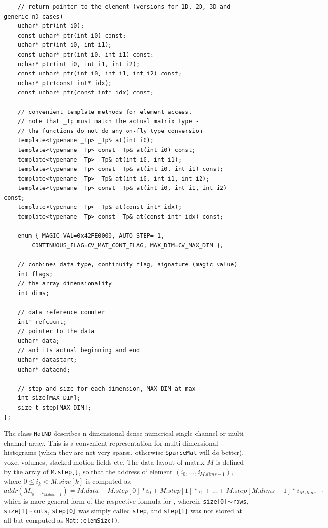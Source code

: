 \begin{lstlisting}
    // return pointer to the element (versions for 1D, 2D, 3D and generic nD cases)
    uchar* ptr(int i0);
    const uchar* ptr(int i0) const;
    uchar* ptr(int i0, int i1);
    const uchar* ptr(int i0, int i1) const;
    uchar* ptr(int i0, int i1, int i2);
    const uchar* ptr(int i0, int i1, int i2) const;
    uchar* ptr(const int* idx);
    const uchar* ptr(const int* idx) const;

    // convenient template methods for element access.
    // note that _Tp must match the actual matrix type -
    // the functions do not do any on-fly type conversion
    template<typename _Tp> _Tp& at(int i0);
    template<typename _Tp> const _Tp& at(int i0) const;
    template<typename _Tp> _Tp& at(int i0, int i1);
    template<typename _Tp> const _Tp& at(int i0, int i1) const;
    template<typename _Tp> _Tp& at(int i0, int i1, int i2);
    template<typename _Tp> const _Tp& at(int i0, int i1, int i2) const;
    template<typename _Tp> _Tp& at(const int* idx);
    template<typename _Tp> const _Tp& at(const int* idx) const;

    enum { MAGIC_VAL=0x42FE0000, AUTO_STEP=-1,
        CONTINUOUS_FLAG=CV_MAT_CONT_FLAG, MAX_DIM=CV_MAX_DIM };

    // combines data type, continuity flag, signature (magic value) 
    int flags;
    // the array dimensionality
    int dims;

    // data reference counter
    int* refcount;
    // pointer to the data
    uchar* data;
    // and its actual beginning and end
    uchar* datastart;
    uchar* dataend;

    // step and size for each dimension, MAX_DIM at max
    int size[MAX_DIM];
    size_t step[MAX_DIM];
};
\end{lstlisting}

The class \texttt{MatND} describes n-dimensional dense numerical single-channel or multi-channel array. This is a convenient representation for multi-dimensional histograms (when they are not very sparse, otherwise \texttt{SparseMat} will do better), voxel volumes, stacked motion fields etc. The data layout of matrix $M$ is defined by the array of \texttt{M.step[]}, so that the address of element $(i_0,...,i_{M.dims-1})$, where $0\leq i_k<M.size[k]$ is computed as:
\[
addr(M_{i_0,...,i_{M.dims-1}}) = M.data + M.step[0]*i_0 + M.step[1]*i_1 + ... + M.step[M.dims-1]*i_{M.dims-1}
\]
which is more general form of the respective formula for , wherein \texttt{size[0]}$\sim$\texttt{rows},
\texttt{size[1]}$\sim$\texttt{cols}, \texttt{step[0]} was simply called \texttt{step}, and \texttt{step[1]} was not stored at all but computed as \texttt{Mat::elemSize()}.

